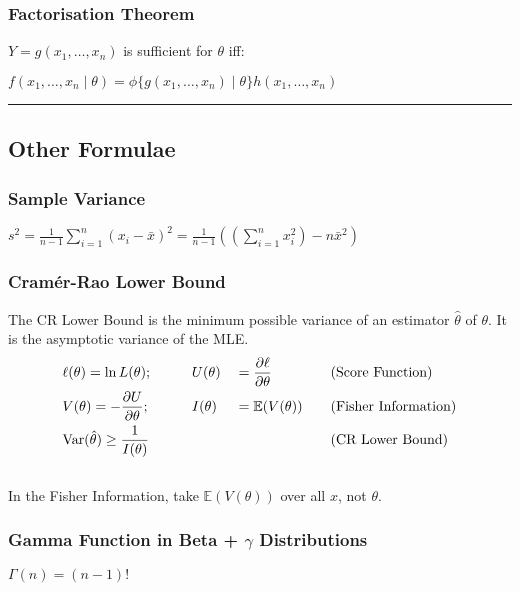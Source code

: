 \documentclass{article}
\begin{document}
\begin{multicols*}{2}
\subsubsection*{Factorisation Theorem}
$Y = g(x_{1}, \dots, x_{n})$ is sufficient for $\theta$ iff:\\
\centerline{$f(x_{1}, \dots, x_{n} \mid \theta) = \phi\{g(x_{1}, \dots, x_{n}) \mid \theta\} h(x_{1}, \dots, x_{n})$}

\noindent\rule{\linewidth}{0.25pt}
\subsection*{Other Formulae}
\subsubsection*{Sample Variance}
$s^2 = \frac{1}{n-1} \sum_{i=1}^{n} (x_{i}-\bar{x})^2 = \frac{1}{n-1} \left( \left( \sum_{i=1}^{n} x_{i}^2 \right) -n \bar{x}^2 \right)$
\subsubsection*{Cramér-Rao Lower Bound}
The CR Lower Bound is the minimum possible variance of an estimator $\hat{\theta}$ of $\theta$. It is the asymptotic variance of the MLE.
\vspace{-0.2cm}
{\setlength{\mathindent}{0.5cm}
\begin{alignat*}{4}
    &\ell(\theta) = \ln L(\theta); &&\qquad U(\theta) &&= \frac{\partial \ell}{\partial \theta} &&\mbox{\quad (Score Function)}\\
    &V(\theta) = -\frac{\partial U}{\partial \theta}; &&\qquad I(\theta) &&= \mathbb{E}(V(\theta)) &&\mbox{\quad (Fisher Information)}\\
    &\mbox{Var}(\hat{\theta}) \geq \frac{1}{I(\theta)} && && &&\mbox{\quad (CR Lower Bound)}
\end{alignat*} \vspace{-0.5cm}}\\
\noindent In the Fisher Information, take $\mathbb{E}(V(\theta))$ over all $x$, not $\theta$.
\subsubsection*{Gamma Function in Beta + $\gamma$ Distributions}
$\Gamma(n) = (n-1)!$
\end{multicols*}
\end{document}
